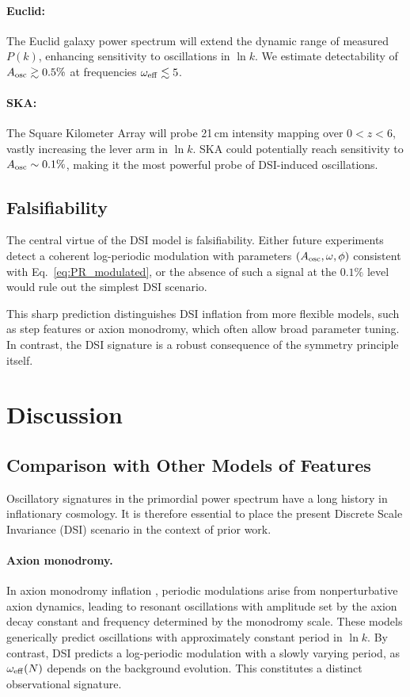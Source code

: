 \documentclass[reprint, amsmath, amssymb, aps, prd, nofootinbib]{revtex4-2}
\begin{document}
\paragraph{Euclid:} The Euclid galaxy power spectrum will extend the dynamic range
of measured $P(k)$, enhancing sensitivity to oscillations in $\ln k$.
We estimate detectability of $A_{\rm osc}\gtrsim 0.5\%$ at frequencies
$\omega_{\rm eff}\lesssim 5$.

\paragraph{SKA:} The Square Kilometer Array will probe 21\,cm intensity mapping
over $0<z<6$, vastly increasing the lever arm in $\ln k$.
SKA could potentially reach sensitivity to $A_{\rm osc}\sim 0.1\%$,
making it the most powerful probe of DSI-induced oscillations.

\subsection{Falsifiability}

The central virtue of the DSI model is falsifiability.
Either future experiments detect a coherent log-periodic modulation with
parameters $(A_{\rm osc},\omega,\phi)$ consistent with Eq.~\eqref{eq:PR_modulated},
or the absence of such a signal at the $0.1\%$ level would rule out
the simplest DSI scenario.

This sharp prediction distinguishes DSI inflation from more flexible models,
such as step features or axion monodromy, which often allow broad parameter
tuning. In contrast, the DSI signature is a robust consequence of the symmetry
principle itself.

\section{Discussion}

\subsection{Comparison with Other Models of Features}

Oscillatory signatures in the primordial power spectrum have a long history in
inflationary cosmology. It is therefore essential to place the present
Discrete Scale Invariance (DSI) scenario in the context of prior work.

\paragraph{Axion monodromy.}
In axion monodromy inflation \cite{Flauger2010}, periodic modulations arise
from nonperturbative axion dynamics, leading to resonant oscillations with
amplitude set by the axion decay constant and frequency determined by the
monodromy scale. These models generically predict oscillations with
approximately constant period in $\ln k$. By contrast, DSI predicts a
log-periodic modulation with a slowly varying period, as $\omega_{\rm eff}(N)$
depends on the background evolution. This constitutes a distinct observational
signature.
\end{document}
